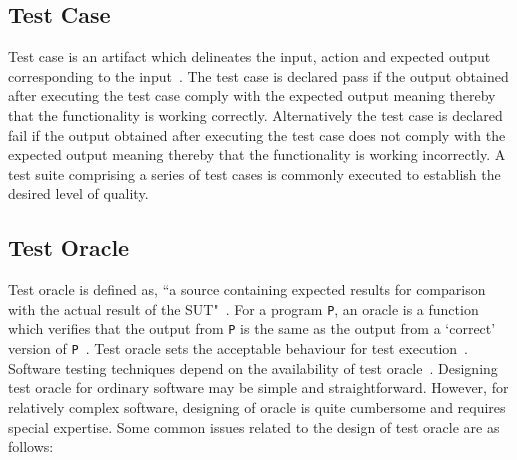 \subsection{Test Case}
Test case is an artifact which delineates the input, action and expected output corresponding to the input~\cite{ahmed2010software}. The test case is declared pass if the output obtained after executing the test case comply with the expected output meaning thereby that the functionality is working correctly. Alternatively the test case is declared fail if the output obtained after executing the test case does not comply with the expected output meaning thereby that the functionality is working incorrectly. %
A test suite comprising a series of test cases is commonly executed to establish the desired level of quality.


\subsection{Test Oracle}
Test oracle is defined as, ``a source containing expected results for comparison with the actual result of the SUT"~\cite{ahmed2010software}. For a program \verb+P+, an oracle is a function which verifies that the output from \verb+P+ is the same as the output from a ‘correct’ version of \verb+P+~\cite{howden1986functional}. Test oracle sets the acceptable behaviour for test execution~\cite{baresi2001test}. Software testing techniques depend on the availability of test oracle~\cite{gaudel2010software}. Designing test oracle for ordinary software may be simple and straightforward. However, for relatively complex software, designing of oracle is quite cumbersome and requires special expertise. 
Some common issues related to the design of test oracle are as follows:

